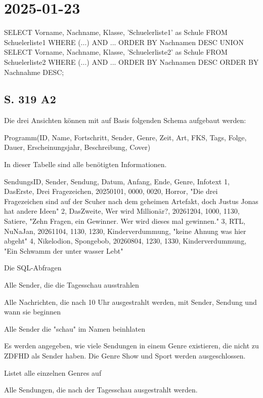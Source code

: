 \section{2025-01-23}

\starttyping
SELECT Vorname, Nachname, Klasse, 'Schuelerliste1' as Schule FROM Schuelerliste1 WHERE (...) AND ... ORDER BY Nachnamen DESC
UNION
SELECT Vorname, Nachname, Klasse, 'Schuelerliste2' as Schule FROM Schuelerliste2 WHERE (...) AND ... ORDER BY Nachnamen DESC
ORDER BY Nachnahme DESC;
\stoptyping

\subsection{S. 319 A2}

\startitemize[packed,a]
\item Die drei Ansichten können mit auf Basis folgenden Schema aufgebaut werden:

Programm(ID, Name, Fortschritt, Sender, Genre, Zeit, Art, FKS, Tags, Folge, Dauer, Erscheinungsjahr, Beschreibung, Cover)

In dieser Tabelle sind alle benötigten Informationen.

\item 

\startframedtext[width=\dimexpr\textwidth+\rightmarginwidth+\rightmargindistance\relax,frame=off,offset=none] %
\startplacetable[location={force},title={Beispiel Datensatz}]
\setupTABLE[r][1][background=color,backgroundcolor=gray]
\bTABLE
\startCSV
SendungsID, Sender, Sendung, Datum, Anfang, Ende, Genre, Infotext
1, DasErste, Drei Fragezeichen, 20250101, 0000, 0020, Horror, "Die drei Fragezeichen sind auf der Scuher nach dem geheimen Artefakt, doch Justus Jonas hat andere Ideen"
2, DasZweite, Wer wird Millionär?, 20261204, 1000, 1130, Satiere, "Zehn Fragen, ein Gewinner. Wer wird dieses mal gewinnen."
3, RTL, NuNaJan, 20261104, 1130, 1230, Kinderverdummung, "keine Ahnung was hier abgeht"
4, Nikelodion, Spongebob, 20260804, 1230, 1330, Kinderverdummung, "Ein Schwamm der unter wasser Lebt"
\stopCSV
\eTABLE
\stopplacetable
\stopframedtext

\item Die SQL-Abfragen
\startitemize[packed,r]
\item Alle Sender, die die Tagesschau ausstrahlen
\item Alle Nachrichten, die nach 10 Uhr ausgestrahlt werden, mit Sender, Sendung und wann sie beginnen
\item Alle Sender die "schau" im Namen beinhlaten
\item Es werden angegeben, wie viele Sendungen in einem Genre existieren, die nicht zu ZDFHD als Sender haben. Die Genre Show und Sport werden ausgeschlossen.
\item Listet alle einzelnen Genres auf
\item Alle Sendungen, die nach der Tagesschau ausgestrahlt werden.
\stopitemize
\stopitemize


